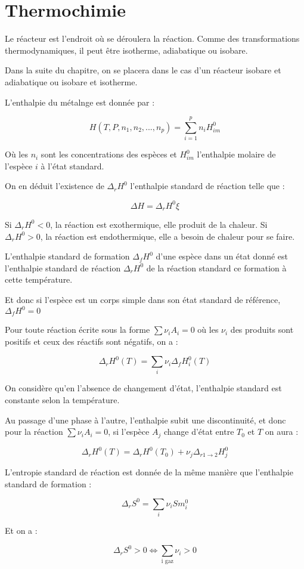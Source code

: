 \documentclass[a4paper,12pt]{book}
\newcommand{\Def}[2]{\begin{tcolorbox}[colback=white,colframe=red!10!green!20!blue!75!, title=Définition : #1]#2\end{tcolorbox}}
\newcommand{\Thr}[2]{\begin{tcolorbox}[sharp corners, colback=white,colframe=red!10!blue!30!green!75!, title=Théorème : #1]#2\end{tcolorbox}}
\begin{document}
\newpage
\section{Thermochimie}
\Def{Réacteurs}{Le réacteur est l'endroit où se déroulera la réaction. Comme des transformations thermodynamiques, il peut être isotherme, adiabatique ou isobare.
\par Dans la suite du chapitre, on se placera dans le cas d'un réacteur isobare et adiabatique ou isobare et isotherme.}
\Def{Enthalpie standard de réaction}{L'enthalpie du métalnge est donnée par :
\par $$H(T,P, n_1,n_2,..., n_p) = \sum\limits_{i=1}^pn_iH_{im}^0$$
\par Où les $n_i$ sont les concentrations des espèces et $H_{im}^0$ l'enthalpie molaire de l'espèce $i$ à l'état standard.
\par On en déduit l'existence de $\Delta_rH^0$ l'enthalpie standard de réaction telle que :
\par $$\Delta H = \Delta_rH^0\xi$$
\par Si $\Delta_rH^0<0$, la réaction est exothermique, elle produit de la chaleur. Si $\Delta_rH^0>0$, la réaction est endothermique, elle a besoin de chaleur pour se faire.}
\Def{Enthalpie standard de formation}{L'enthalpie standard de formation $\Delta_fH^0$ d'une espèce dans un état donné est l'enthalpie standard de réaction $\Delta_rH^0$ de la réaction standard ce formation à cette température.
\par Et donc si l'espèce est un corps simple dans son état standard de référence, $\Delta_fH^0 =0$}
\Thr{Loi de Hess}{Pour toute réaction écrite sous la forme $\sum\nu_iA_i = 0$ où les $\nu_i$ des produits sont positifs et ceux des réactifs sont négatifs, on a :
\par $$\Delta_rH^0(T) = \sum\limits_i\nu_i\Delta_fH_i^0(T)$$}
\Thr{Approximation d'Ellingham}{On considère qu'en l'absence de changement d'état, l'enthalpie standard est constante selon la température.
\par Au passage d'une phase à l'autre, l'enthalpie subit une discontinuité, et donc pour la réaction $\sum\nu_iA_i=0$, si l'espèce $A_j$ change d'état entre $T_0$ et $T$ on aura :
\par $$\Delta_rH^0(T)=\Delta_rH^0(T_0)+\nu_j\Delta_{r1\to 2}H_j^0$$}
\Def{Entropie standard de réaction}{L'entropie standard de réaction est donnée de la même manière que l'enthalpie standard de formation :
\par $$\Delta_rS^0 = \sum\limits_i\nu_iSm^0_i$$
\par Et on a :
\par $$\Delta_rS^0>0\Leftrightarrow \sum\limits_{\text{i gaz}}\nu_i>0$$}
\end{document}
